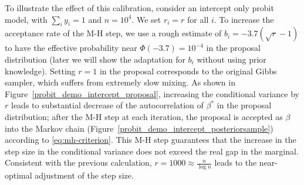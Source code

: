 \documentclass[10pt]{article}
\begin{document}
To illustrate the effect of this calibration, consider an intercept only probit model, with $\sum_i y_i =1$ and $n=10^4$. We set $r_i=r$ for all $i$. To increase the acceptance rate of the M-H step, we use a rough estimate of $b_i = -3.7 (\sqrt r -1)$ to have the effective probability near $\Phi(-3.7)= 10^{-4}$ in the proposal distribution (later we will show the adaptation for $b_i$ without using prior knowledge). Setting $r=1$ in the proposal corresponds to the original \cite{albert1993bayesian} Gibbs sampler, which suffers from extremely slow mixing. As shown in Figure~\ref{probit_demo_intercept_proposal}, increasing the conditional variance by $r$ leads to substantial decrease of the autocorrelation of $\beta^*$ in the proposal distribution; after the M-H step at each iteration, the proposal is accepted as $\beta$ into the Markov chain (Figure~\ref{probit_demo_intercept_posteriorsample}) according to \eqref{eq:mh-criterion}. This M-H step guarantees that the increase in the step size in the conditional variance does not exceed the real gap in the marginal. Consistent with the previous calculation, $r= 1000\approx \frac{n}{\log n}$ leads to the near-optimal adjustment of the step size.
\end{document}
